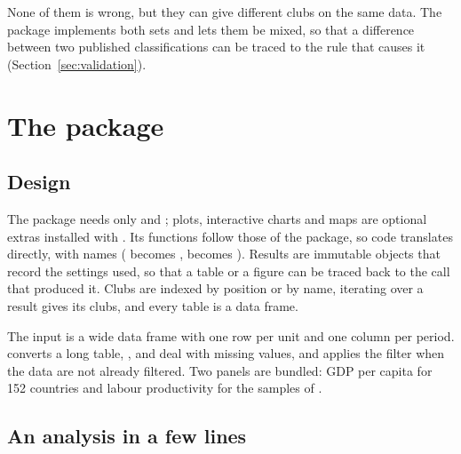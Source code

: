 \documentclass[article]{jss}
\begin{document}
None of them is wrong, but they can give different clubs on the same data. The package
implements both sets and lets them be mixed, so that a difference between two published
classifications can be traced to the rule that causes it
(Section~\ref{sec:validation}).

\section{The package} \label{sec:design}

\subsection{Design}

The package needs only  and ; plots, interactive charts and maps
are optional extras installed with . Its
functions follow those of the  package, so  code translates
directly, with  names ( becomes ,
 becomes ). Results are immutable
objects that record the settings used, so that a table or a figure can be traced back to
the call that produced it. Clubs are indexed by position or by name, iterating over a
result gives its clubs, and every table is a  data frame.

The input is a wide data frame with one row per unit and one column per period.
 converts a long table, ,  and
 deal with missing values, and  applies the
\citet{Hodrick1997} filter when the data are not already filtered. Two panels are bundled:
GDP per capita for 152 countries and labour productivity for the samples of
\citet{Mendez2020}.

\subsection{An analysis in a few lines}
\end{document}
